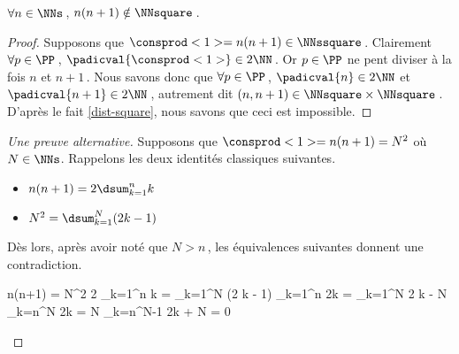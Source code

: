 \begin{fact} \label{case-1}
	 $\forall n \in \NNs$\,, $n(n+1) \notin \NNsquare$\,.
\end{fact}




\begin{proof}
    Supposons que $\consprod<1> = n(n+1) \in \NNssquare$\,.
    Clairement $\forall p \in \PP$\,, $\padicval{\consprod<1>} \in 2 \NN$\,.
    Or $p \in \PP$ ne pent diviser à la fois $n$ et $n+1$\,.
    Nous savons donc que $\forall p \in \PP$\,, 
    $\padicval{n} \in 2 \NN$ et $\padicval{n+1} \in 2 \NN$\,,
    autrement dit 
    $(n, n + 1) \in \NNsquare \times \NNsquare$\,.
    D'après le fait \ref{dist-square}, nous savons que ceci est impossible.
\end{proof}




\begin{proof}[Une preuve alternative]
     Supposons que $\consprod<1> = n(n+1) = N^2$ où $N \in \NNs$.
     Rappelons les deux identités classiques suivantes.
     \begin{itemize}
     	\item $n(n+1) = 2 \dsum_{k=1}^{n} k$

     	\item $N^2 = \dsum_{k=1}^{N} (2 k - 1)$
     \end{itemize}
     Dès lors, après avoir noté que $N > n$\,, les équivalences suivantes donnent une contradiction.
	
	\medskip
	
	\begin{stepcalc}[style = sar, ope = \iff]
		n(n+1) = N^2
	\explnext{}
		2 \dsum_{k=1}^{n} k = \dsum_{k=1}^{N} (2 k - 1)
	\explnext{}
		\dsum_{k=1}^{n} 2k = \dsum_{k=1}^{N} 2 k - N
	\explnext{}
		\dsum_{k=n}^{N} 2k = N
		\dsum_{k=n}^{N-1} 2k + N = 0
	\end{stepcalc}

	\leavevmode
\end{proof}
